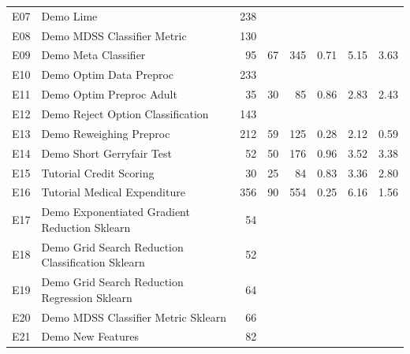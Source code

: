 \documentclass[sigconf,review]{acmart}
\begin{document}
\begin{table}[]
\begin{tabular}{clrrrrrr}
		E07 & Demo   Lime                                       & 238 &    &     &      &      &      \\
		E08 & Demo MDSS Classifier Metric                       & 130 &    &     &      &      &      \\
		E09 & Demo Meta Classifier                              & 95  & 67 & 345 & 0.71 & 5.15 & 3.63 \\
		E10 & Demo Optim Data Preproc                           & 233 &    &     &      &      &      \\
		E11 & Demo Optim Preproc Adult                          & 35  & 30 & 85  & 0.86 & 2.83 & 2.43 \\
		E12 & Demo Reject Option Classification                 & 143 &    &     &      &      &      \\
		E13 & Demo Reweighing Preproc                           & 212 & 59 & 125 & 0.28 & 2.12 & 0.59 \\
		E14 & Demo Short Gerryfair Test                         & 52  & 50 & 176 & 0.96 & 3.52 & 3.38 \\
		E15 & Tutorial Credit Scoring                           & 30  & 25 & 84  & 0.83 & 3.36 & 2.80 \\
		E16 & Tutorial Medical Expenditure                      & 356 & 90 & 554 & 0.25 & 6.16 & 1.56 \\
		E17 & Demo Exponentiated Gradient Reduction Sklearn     & 54  &    &     &      &      &      \\
		E18 & Demo Grid Search Reduction Classification Sklearn & 52  &    &     &      &      &      \\
		E19 & Demo Grid Search Reduction Regression Sklearn     & 64  &    &     &      &      &      \\
		E20 & Demo MDSS Classifier Metric Sklearn               & 66  &    &     &      &      &      \\
		E21 & Demo New Features                                 & 82  &    &     &      &      &      \\ \hline
	\end{tabular}
\end{table}
\end{document}
